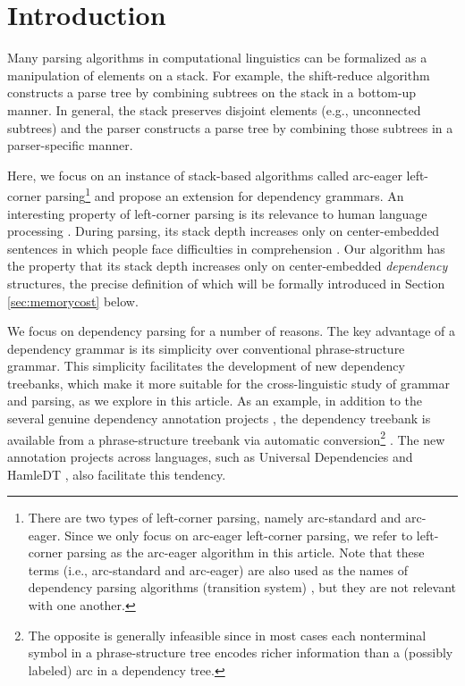 \documentclass[english]{jnlp_1.4}
\begin{document}
\maketitle

\section{Introduction}

Many parsing algorithms in computational linguistics can be formalized as a manipulation of elements on a stack.
For example, the shift-reduce algorithm constructs a parse tree by combining subtrees on the stack in a bottom-up manner.
In general, the stack preserves disjoint elements (e.g., unconnected subtrees) and the parser constructs a parse tree by combining those subtrees in a parser-specific manner.

Here, we focus on an instance of stack-based algorithms called arc-eager left-corner parsing\footnote{There are two types of left-corner parsing, namely arc-standard and arc-eager. Since we only focus on arc-eager left-corner parsing, we refer to left-corner parsing as the arc-eager algorithm in this article. Note that these terms (i.e., arc-standard and arc-eager) are also used as the names of dependency parsing algorithms (transition system) \cite{Nivre:2008}, but they are not relevant with one another.} and propose an extension for dependency grammars.
An interesting property of left-corner parsing is its relevance to human language processing \cite{Cognitive:MentalModels,abney91memory,journals/coling/SchulerAMS10}.
During parsing, its stack depth increases only on center-embedded sentences in which people face difficulties in comprehension \cite{Miller1963-MILFMO,Gibson2000The-dependency-}.
Our algorithm has the property that its stack depth increases only on center-embedded {\it dependency} structures, the precise definition of which will be formally introduced in Section \ref{sec:memorycost} below.

We focus on dependency parsing for a number of reasons.
The key advantage of a dependency grammar is its simplicity over conventional phrase-structure grammar.
This simplicity facilitates the development of new dependency treebanks, which make it more suitable for the cross-linguistic study of grammar and parsing, as we explore in this article.
As an example, in addition to the several genuine dependency annotation projects \cite{sl,ar}, the dependency treebank is available from a phrase-structure treebank via automatic conversion\footnote{The opposite is generally infeasible since in most cases each nonterminal symbol in a phrase-structure tree encodes richer information than a (possibly labeled) arc in a dependency tree.} \cite{Yamada03}.
The new annotation projects across languages, such as Universal Dependencies \cite{DEMARNEFFE14.1062} and HamleDT \cite{halmedt}, also facilitate this tendency.
\end{document}
